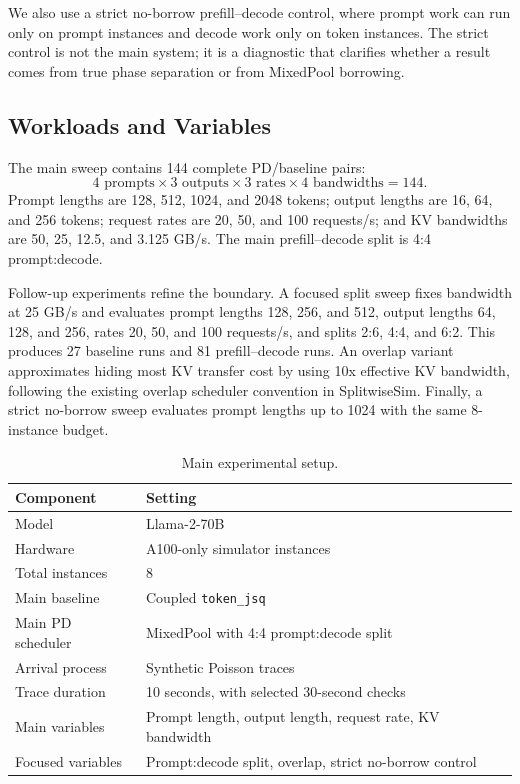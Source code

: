 \documentclass[10pt]{article}
\newcommand{\pd}{prefill--decode}
\begin{document}
We also use a strict no-borrow \pd{} control, where prompt work can run only on prompt instances and decode work only on token instances. The strict control is not the main system; it is a diagnostic that clarifies whether a result comes from true phase separation or from MixedPool borrowing.

\subsection{Workloads and Variables}
The main sweep contains 144 complete PD/baseline pairs:
\[
4 \text{ prompts} \times 3 \text{ outputs} \times 3 \text{ rates} \times 4 \text{ bandwidths}=144.
\]
Prompt lengths are 128, 512, 1024, and 2048 tokens; output lengths are 16, 64, and 256 tokens; request rates are 20, 50, and 100 requests/s; and KV bandwidths are 50, 25, 12.5, and 3.125 GB/s. The main \pd{} split is 4:4 prompt:decode.

Follow-up experiments refine the boundary. A focused split sweep fixes bandwidth at 25 GB/s and evaluates prompt lengths 128, 256, and 512, output lengths 64, 128, and 256, rates 20, 50, and 100 requests/s, and splits 2:6, 4:4, and 6:2. This produces 27 baseline runs and 81 \pd{} runs. An overlap variant approximates hiding most KV transfer cost by using 10x effective KV bandwidth, following the existing overlap scheduler convention in SplitwiseSim. Finally, a strict no-borrow sweep evaluates prompt lengths up to 1024 with the same 8-instance budget.

\begin{table}[t]
\centering
\small
\caption{Main experimental setup.}
\label{tab:setup}
\begin{tabular}{ll}
\toprule
Component & Setting \\
\midrule
Model & Llama-2-70B \\
Hardware & A100-only simulator instances \\
Total instances & 8 \\
Main baseline & Coupled \texttt{token\_jsq} \\
Main PD scheduler & MixedPool with 4:4 prompt:decode split \\
Arrival process & Synthetic Poisson traces \\
Trace duration & 10 seconds, with selected 30-second checks \\
Main variables & Prompt length, output length, request rate, KV bandwidth \\
Focused variables & Prompt:decode split, overlap, strict no-borrow control \\
\bottomrule
\end{tabular}
\end{table}
\end{document}
